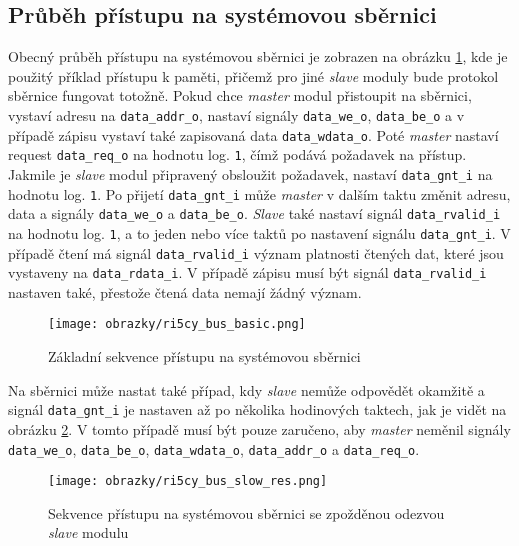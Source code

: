 \subsection{Průběh přístupu na systémovou sběrnici}
Obecný průběh přístupu na systémovou sběrnici je zobrazen na obrázku \ref{fig:ri5cy_bus_basic}, kde je použitý příklad přístupu k paměti, přičemž pro jiné \textit{slave} moduly bude protokol sběrnice fungovat totožně. Pokud chce \textit{master} modul přistoupit na sběrnici, vystaví adresu na \texttt{data\_addr\_o}, nastaví signály \texttt{data\_we\_o}, \texttt{data\_be\_o} a v případě zápisu vystaví také zapisovaná data \texttt{data\_wdata\_o}. Poté \textit{master} nastaví request \texttt{data\_req\_o} na hodnotu log. \texttt{1}, čímž podává požadavek na přístup. Jakmile je \textit{slave} modul připravený obsloužit požadavek, nastaví \texttt{data\_gnt\_i} na hodnotu log. \texttt{1}. Po přijetí \texttt{data\_gnt\_i} může \textit{master} v dalším taktu změnit adresu, data a signály \texttt{data\_we\_o} a \texttt{data\_be\_o}. \textit{Slave} také nastaví signál \texttt{data\_rvalid\_i} na hodnotu log. \texttt{1}, a to jeden nebo více taktů po nastavení signálu \texttt{data\_gnt\_i}. V případě čtení má signál \texttt{data\_rvalid\_i} význam platnosti čtených dat, které jsou vystaveny na \texttt{data\_rdata\_i}. V případě zápisu musí být signál \texttt{data\_rvalid\_i} nastaven také, přestože čtená data nemají žádný význam. \cite{ri5cy}
 
\begin{figure}[t]
  \begin{center}
    \texttt{[image: obrazky/ri5cy\_bus\_basic.png]}
  \end{center}
  \caption{Základní sekvence přístupu na systémovou sběrnici \cite{ri5cy}}
	\label{fig:ri5cy_bus_basic}
\end{figure}

Na sběrnici může nastat také případ, kdy \textit{slave} nemůže odpovědět okamžitě a signál \texttt{data\_gnt\_i} je nastaven až po několika hodinových taktech, jak je vidět na obrázku \ref{fig:ri5cy_bus_slow_res}. V tomto případě musí být pouze zaručeno, aby \textit{master} neměnil signály \texttt{data\_we\_o}, \texttt{data\_be\_o}, \texttt{data\_wdata\_o}, \texttt{data\_addr\_o} a \texttt{data\_req\_o}. 

\begin{figure}[H]
  \begin{center}
    \texttt{[image: obrazky/ri5cy\_bus\_slow\_res.png]}
  \end{center}
  \caption{Sekvence přístupu na systémovou sběrnici se zpožděnou odezvou \textit{slave} modulu \cite{ri5cy}}
	\label{fig:ri5cy_bus_slow_res}
\end{figure}


